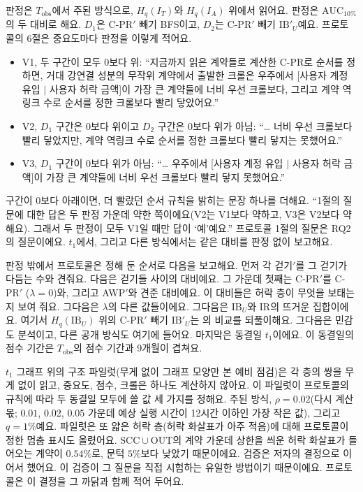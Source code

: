 판정은 $T_{\mathrm{obs}}$에서 주된 방식으로, $H_q(I_T)$와 $H_q(I_A)$ 위에서 읽어요. 판정은 $\mathrm{AUC}_{10\%}$의 두 대비로 해요. $D_1$은 \mbox{C-PR}$'$ 빼기 BFS이고, $D_2$는 \mbox{C-PR}$'$ 빼기 $\mathrm{IB}'_U$예요. 프로토콜의 6절은 중요도마다 판정을 이렇게 적어요.
\begin{itemize}
\item V1, 두 구간이 모두 $0$보다 위: “지금까지 읽은 계약들로 계산한 \mbox{C-PR}로 순서를 정하면, 거대 강연결 성분의 무작위 계약에서 출발한 크롤은 우주에서 [사용자 계정 유입 $\mid$ 사용자 허락 금액]이 가장 큰 계약들에 너비 우선 크롤보다, 그리고 계약 역링크 수로 순서를 정한 크롤보다 빨리 닿았어요.”
\item V2, $D_1$ 구간은 $0$보다 위이고 $D_2$ 구간은 $0$보다 위가 아님: “\ldots{} 너비 우선 크롤보다 빨리 닿았지만, 계약 역링크 수로 순서를 정한 크롤보다 빨리 닿지는 못했어요.”
\item V3, $D_1$ 구간이 $0$보다 위가 아님: “\ldots{} 우주에서 [사용자 계정 유입 $\mid$ 사용자 허락 금액]이 가장 큰 계약들에 너비 우선 크롤보다 빨리 닿지 못했어요.”
\end{itemize}
구간이 $0$보다 아래이면, 더 빨랐던 순서 규칙을 밝히는 문장 하나를 더해요. “1절의 질문에 대한 답은 두 판정 가운데 약한 쪽이에요(V2는 V1보다 약하고, V3은 V2보다 약해요). 그래서 두 판정이 모두 V1일 때만 답이 ‘예’예요.” 프로토콜 1절의 질문은 RQ2의 질문이에요. $t_1$에서, 그리고 다른 방식에서는 같은 대비를 판정 없이 보고해요.

판정 밖에서 프로토콜은 정해 둔 순서로 다음을 보고해요. 먼저 각 걷기$'$를 그 걷기가 다듬는 수와 견줘요. 다음은 걷기들 사이의 대비예요. 그 가운데 첫째는 \mbox{C-PR}$'$를 \mbox{C-PR}$'$ ($\lambda=0$)와, 그리고 AWP$'$와 견준 대비예요. 이 대비들은 허락 층이 무엇을 보태는지 보여 줘요. 그다음은 $\lambda$의 다른 값들이에요. 그다음은 $\mathrm{IB}_U$와 $\mathrm{IR}$의 뜨거운 집합이에요. 여기서 $H_q(\mathrm{IB}_U)$ 위의 \mbox{C-PR}$'$ 빼기 $\mathrm{IB}'_U$는 \textcite{cho1998crawling}의 비교를 되풀이해요. 그다음은 민감도 분석이고, 다른 공개 방식도 여기에 들어요. 마지막은 동결일 $t_1$이에요. 이 동결일의 점수 기간은 $T_{\mathrm{obs}}$의 점수 기간과 9개월이 겹쳐요.

$t_1$ 그래프 위의 구조 파일럿(무게 없이 그래프 모양만 본 예비 점검)은 각 층의 쌍을 무게 없이 읽고, 중요도, 점수, 크롤은 하나도 계산하지 않아요. 이 파일럿이 프로토콜의 규칙에 따라 두 동결일 모두에 쓸 값 세 가지를 정해요. 주된 방식, $\rho=0.02$(다시 계산 몫; $0.01$, $0.02$, $0.05$ 가운데 예상 실행 시간이 12시간 이하인 가장 작은 값), 그리고 $q=1\%$예요. 파일럿은 또 얇은 허락 층(허락 화살표가 아주 적음)에 대해 프로토콜이 정한 멈춤 표시도 올렸어요. $\mathrm{SCC}\cup\mathrm{OUT}$의 계약 가운데 상한을 씌운 허락 화살표가 들어오는 계약이 $0.54\%$로, 문턱 $5\%$보다 낮았기 때문이에요. 검증은 저자의 결정으로 이어서 했어요. 이 검증이 그 질문을 직접 시험하는 유일한 방법이기 때문이에요. 프로토콜은 이 결정을 그 까닭과 함께 적어 두어요.

